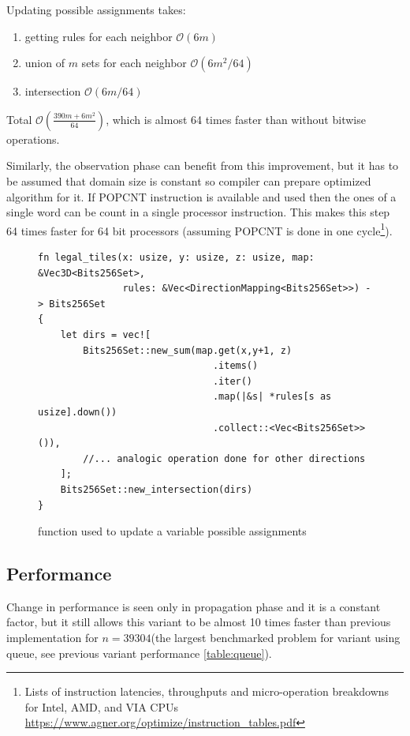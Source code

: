 \documentclass[shortabstract, english, inz]{iithesis}
\begin{document}
Updating possible assignments takes:
\begin{enumerate}
    \item getting rules for each neighbor \(\mathcal{O}(6m)\)
    \item union of \(m\) sets for each neighbor \(\mathcal{O}(6m^2/64)\)
    \item intersection \(\mathcal{O}(6m/64)\)
\end{enumerate}
Total \(\mathcal{O}(\frac{390m + 6m^2}{64})\), which is almost 64 times faster than without bitwise operations.

Similarly, the observation phase can benefit from this improvement, but it has to be assumed that domain size is constant so compiler can prepare optimized algorithm for it. If POPCNT instruction is available and used then the ones of a single word can be count in a single processor instruction. This makes this step 64 times faster for 64 bit processors (assuming POPCNT is done in one cycle\footnote{Lists of instruction latencies, throughputs and micro-operation breakdowns for Intel, AMD,
and VIA CPUs \url{https://www.agner.org/optimize/instruction_tables.pdf}}).

\begin{figure}
\begin{verbatim}
fn legal_tiles(x: usize, y: usize, z: usize, map: &Vec3D<Bits256Set>,
               rules: &Vec<DirectionMapping<Bits256Set>>) -> Bits256Set
{
    let dirs = vec![
        Bits256Set::new_sum(map.get(x,y+1, z)
                               .items()
                               .iter()
                               .map(|&s| *rules[s as usize].down())
                               .collect::<Vec<Bits256Set>>()),
        //... analogic operation done for other directions
    ];
    Bits256Set::new_intersection(dirs)
}
\end{verbatim}
\caption{function used to update a variable possible assignments}
\label{fig:legal_tiles_bits}
\end{figure}



\subsection{Performance}
Change in performance is seen only in propagation phase and it is a constant factor, but it still allows this variant to be almost 10 times faster than previous implementation for \(n = 39304\)(the largest benchmarked problem for variant using queue, see previous variant performance \ref{table:queue}).
\end{document}
